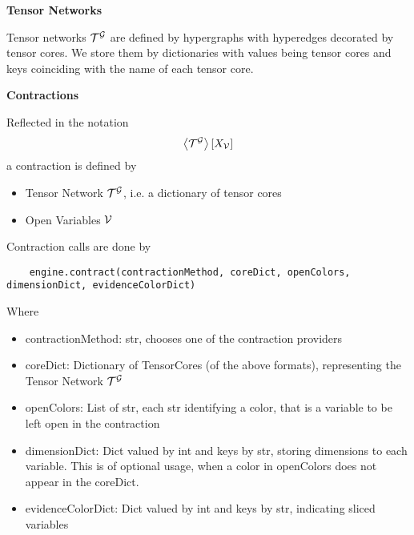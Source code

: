 \textbf{Tensor Networks}

Tensor networks $\mathcal{T}^{\mathcal{G}}$ are defined by hypergraphs with hyperedges decorated by tensor cores. 
We store them by dictionaries with values being tensor cores and keys coinciding with the name of each tensor core.


\textbf{Contractions}

Reflected in the notation
	\[ \left\langle \mathcal{T}^{\mathcal{G}}\right\rangle \left[ X_{\mathcal{V}} \right] \]
a contraction is defined by
\begin{itemize}
	\item Tensor Network $\mathcal{T}^{\mathcal{G}}$, i.e. a dictionary of tensor cores
	\item Open Variables $\mathcal{V}$
\end{itemize}
Contraction calls are done by
\begin{lstlisting}
	engine.contract(contractionMethod, coreDict, openColors, dimensionDict, evidenceColorDict)
\end{lstlisting}
Where
\begin{itemize}
	\item contractionMethod: str, chooses one of the contraction providers
	\item coreDict: Dictionary of TensorCores (of the above formats), representing the Tensor Network $\mathcal{T}^{\mathcal{G}}$ 
	\item openColors: List of str, each str identifying a color, that is a variable to be left open in the contraction
	\item dimensionDict: Dict valued by int and keys by str, storing dimensions to each variable. This is of optional usage, when a color in openColors does not appear in the coreDict.
	\item evidenceColorDict: Dict valued by int and keys by str, indicating sliced variables
\end{itemize}

